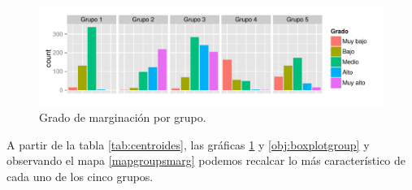 \begin{figure}[!ht]
  \centering
  \includegraphics[width=\textwidth]{./plots/gmarg_group.pdf}
  \caption{Grado de marginación por grupo. \label{obj:gradomarggrupos} }
\end{figure}

A partir de la tabla \ref{tab:centroides}, las gráficas \ref{obj:gradomarggrupos} y \ref{obj:boxplotgroup} y observando el mapa \ref{mapgroupsmarg} podemos recalcar lo más característico de cada uno de los cinco grupos.

